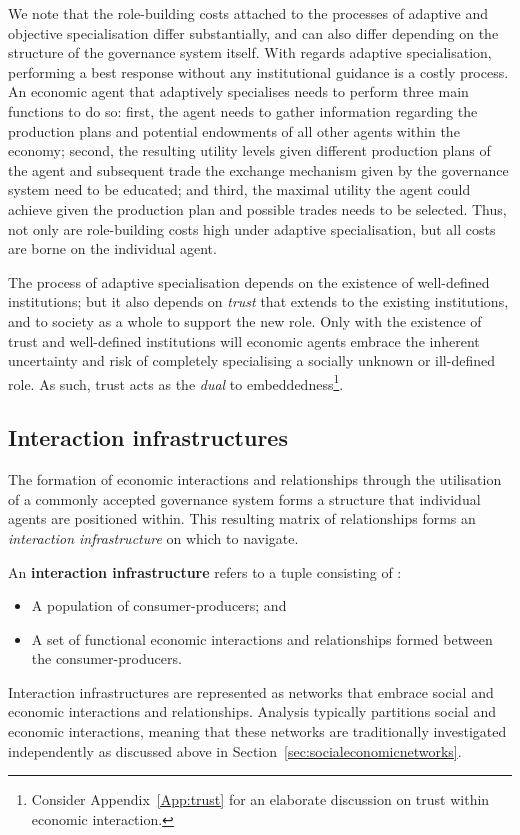 We note that the role-building costs attached to the processes of adaptive and objective specialisation differ substantially, and can also differ depending on the structure of the governance system itself. With regards adaptive specialisation, performing a best response without any institutional guidance is a costly process. An economic agent that adaptively specialises needs to perform three main functions to do so: first, the agent needs to gather information regarding the production plans and potential endowments of all other agents within the economy; second, the resulting utility levels given different production plans of the agent and subsequent trade the exchange mechanism given by the governance system need to be educated; and third, the maximal utility the agent could achieve given the production plan and possible trades needs to be selected. Thus, not only are role-building costs high under adaptive specialisation, but all costs are borne on the individual agent.

The process of adaptive specialisation depends on the existence of well-defined institutions; but it also depends on \emph{trust} that extends to the existing institutions, and to society as a whole to support the new role. Only with the existence of trust and well-defined institutions will economic agents embrace the inherent uncertainty and risk of completely specialising a socially unknown or ill-defined role. As such, trust acts as the \emph{dual} to embeddedness\footnote{Consider Appendix~\ref{App:trust} for an elaborate discussion on trust within economic interaction.}.

\subsection{Interaction infrastructures}

The formation of economic interactions and relationships through the utilisation of a commonly accepted governance system forms a structure that individual agents are positioned within. This resulting matrix of relationships forms an \emph{interaction infrastructure} on which to navigate.
\begin{definition} \label{definition:interactionInfrastruture}
An \textbf{interaction infrastructure} refers to a tuple consisting of : 
\begin{itemize}
\item[(1)] A population of consumer-producers; and 
\item[(2)] A set of functional economic interactions and relationships formed between the consumer-producers.
\end{itemize}
\end{definition} 
Interaction infrastructures are represented as networks that embrace social and economic interactions and relationships. Analysis typically partitions social and economic interactions, meaning that these networks are traditionally investigated independently as discussed above in Section~\ref{sec:socialeconomicnetworks}.

